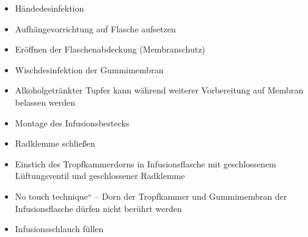 \documentclass{article}
\begin{document}
\begin{itemize}
\item H\"andedesinfektion         

\item Aufh\"angevorrichtung auf Flasche aufsetzen

\item Er\"offnen der Flaschenabdeckung (Membranschutz)

\item Wischdesinfektion der Gummimembran

\end{itemize}
\begin{itemize}
\item Alkoholgetr\"ankter Tupfer kann w\"ahrend weiterer Vorbereitung
auf Membran belassen werden

\end{itemize}
\begin{itemize}
\item Montage des Infusionsbestecks

\end{itemize}
\begin{itemize}
\item Radklemme schlie{\ss}en 

\item Einstich des Tropfkammerdorns in Infusionsflasche mit
geschlossenem L\"uftungsventil und geschlossener Radklemme

\item {\quotedblbase}No touch technique{\textquotedblleft} -- Dorn der
Tropfkammer und Gummimembran der Infusionsflasche d\"urfen nicht
ber\"uhrt werden

\end{itemize}
\begin{itemize}
\item Infusionsschlauch f\"ullen

\end{itemize}
\end{document}
